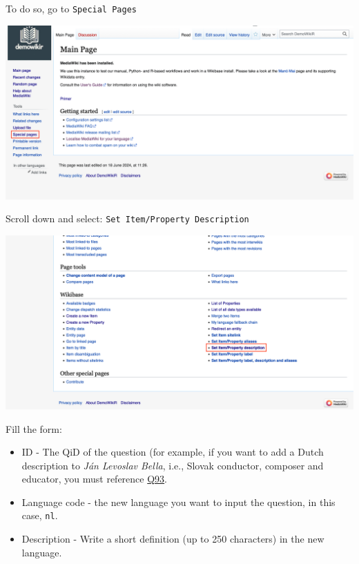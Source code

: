 \documentclass[
  letterpaper,
  DIV=11,
  numbers=noendperiod]{scrreprt}
\begin{document}
To do so, go to \texttt{Special\ Pages}

\begin{center}
\includegraphics{png/question_to_wikibase/wikidata_specialPages_2x1.png}
\end{center}

Scroll down and select: \texttt{Set\ Item/Property\ Description}

\begin{center}
\includegraphics{png/question_to_wikibase/SpecialPages_Set_ItemProperty_Description_2x1.png}
\end{center}

Fill the form:

\begin{itemize}
\item
  ID - The QiD of the question (for example, if you want to add a Dutch
  description to \emph{Ján Levoslav Bella}, i.e., Slovak conductor,
  composer and educator, you must reference
  \href{https://reprexbase.eu/demowiki/index.php?title=Item:Q93}{Q93}.
\item
  Language code - the new language you want to input the question, in
  this case, \texttt{nl}.
\item
  Description - Write a short definition (up to 250 characters) in the
  new language.
\end{itemize}
\end{document}
